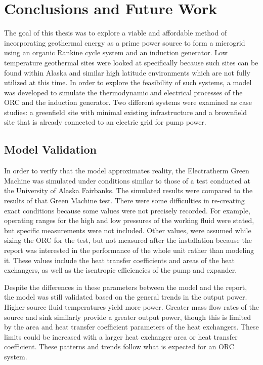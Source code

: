 \chapter{Conclusions and Future Work}
\label{ch:conclusion}

The goal of this thesis was to explore a viable and affordable method of incorporating geothermal energy as a prime power source to form a microgrid using an organic Rankine cycle system and an induction generator. Low temperature geothermal sites were looked at specifically because such sites can be found within Alaska and similar high latitude environments which are not fully utilized at this time. In order to explore the feasibility of such systems, a model was developed to simulate the thermodynamic and electrical processes of the ORC and the induction generator. Two different systems were examined as case studies: a greenfield site with minimal existing infrastructure and a brownfield site that is already connected to an electric grid for pump power. 

\section{Model Validation}
In order to verify that the model approximates reality, the Electratherm Green Machine was simulated under conditions similar to those of a test conducted at the University of Alaska Fairbanks. The simulated results were compared to the results of that Green Machine test. There were some difficulties in re-creating exact conditions because some values were not precisely recorded. For example, operating ranges for the high and low pressures of the working fluid were stated, but specific measurements were not included. 
Other values, were assumed while sizing the ORC for the test, but not measured after the installation because the report was interested in the performance of the whole unit rather than modeling it. These values include the heat transfer coefficients and areas of the heat exchangers, as well as the isentropic efficiencies of the pump and expander.

Despite the differences in these parameters between the model and the report, the model was still validated based on the general trends in the output power. Higher source fluid temperatures yield more power. Greater mass flow rates of the source and sink similarly provide a greater output power, though this is limited by the area and heat transfer coefficient parameters of the heat exchangers. These limits could be increased with a larger heat exchanger area or heat transfer coefficient. These patterns and trends follow what is expected for an ORC system.

